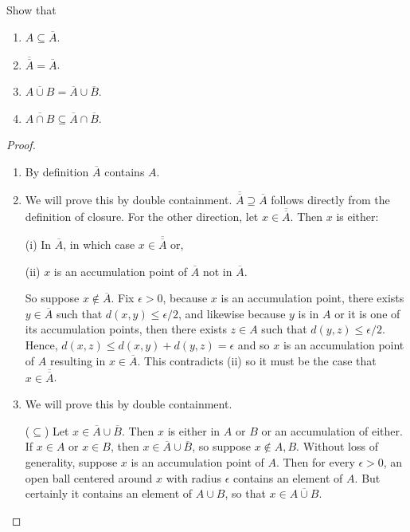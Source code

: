\begin{exercise}{9}
Show that 
\begin{enumerate}
    \item $A\subseteq\overline{A}$.
    \item $\overline{\overline{A}}=\overline{A}$.
    \item $\overline{A\cup B}=\overline{A}\cup\overline{B}$.
    \item $\overline{A\cap B}\subseteq\overline{A}\cap\overline{B}$.
\end{enumerate}
\end{exercise}
\begin{proof}
\begin{enumerate}
    \item By definition $\overline{A}$ contains $A$.
    \item We will prove this by double containment. $\overline{\overline{A}}\supseteq\overline{A}$ follows directly from the definition of closure. For the other direction, let $x\in \overline{\overline{A}}$. Then $x$ is either:
    
    (i) In $\overline{A}$, in which case $x\in\overline{\overline{A}}$ or,
    
    (ii) $x$ is an accumulation point of $\overline{A}$ not in $\overline{A}$.
    
    So suppose $x\notin \overline{A}$. Fix $\epsilon>0$, because $x$ is an accumulation point, there exists $y\in\overline{A}$ such that $d(x,y)\leq \epsilon/2$, and likewise because $y$ is in $A$ or it is one of its accumulation points, then  there exists $z\in A$ such that $d(y,z)\leq \epsilon/2$. Hence, $d(x,z)\leq d(x,y)+d(y,z) =\epsilon$ and so $x$ is an accumulation point of $A$ resulting in $x\in\overline{A}$. This contradicts (ii) so it must be the case that $x\in\overline{\overline{A}}$.
    \item We will prove this by double containment. 

    ($\subseteq$) Let $x\in\overline{A}\cup\overline{B}$. Then $x$ is either in $A$ or $B$ or an accumulation of either. If $x\in A$ or $x\in B$, then $x\in\overline{A}\cup\overline{B}$, so suppose $x\notin A,B$. Without loss of generality, suppose $x$ is an accumulation point of $A$. Then for every $\epsilon>0$, an open ball centered around $x$ with radius $\epsilon$ contains an element of $A$. But certainly it contains an element of $A\cup B$, so that $x\in\overline{A\cup B}$.


\end{enumerate}
\end{proof}
